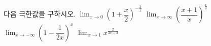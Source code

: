 다음 극한값을 구하시오.
 $\displaystyle\lim_{x\to 0}\left(1+\dfrac{x}{2}\right)^{-\frac{3}{x}}$
 $\displaystyle\lim_{x\to\infty}\left(\dfrac{x+1}{x}\right)^{\frac{x}{3}}$
 $\displaystyle\lim_{x\to-\infty}\left(1-\dfrac{1}{2x}\right)^{x}$
 $\displaystyle\lim_{x\to 1}x^{\frac{2}{3x-3}}$
